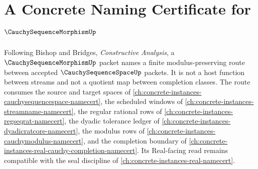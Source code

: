 \chapter{A Concrete Naming Certificate for $\CauchySequenceMorphismUp$}
\label{ch:concrete-instances-cauchy-sequence-morphism-namecert}

Following Bishop and Bridges, \emph{Constructive Analysis}, a $\CauchySequenceMorphismUp$ packet names a finite modulus-preserving route between accepted $\CauchySequenceSpaceUp$ packets. It is not a host function between streams and not a quotient map between completion classes. The route consumes the source and target spaces of \autoref{ch:concrete-instances-cauchysequencespace-namecert}, the scheduled windows of \autoref{ch:concrete-instances-streamname-namecert}, the regular rational rows of \autoref{ch:concrete-instances-regseqrat-namecert}, the dyadic tolerance ledger of \autoref{ch:concrete-instances-dyadicratcore-namecert}, the modulus rows of \autoref{ch:concrete-instances-cauchymodulus-namecert}, and the completion boundary of \autoref{ch:concrete-instances-real-cauchy-completion-namecert}. Its Real-facing read remains compatible with the seal discipline of \autoref{ch:concrete-instances-real-namecert}.

